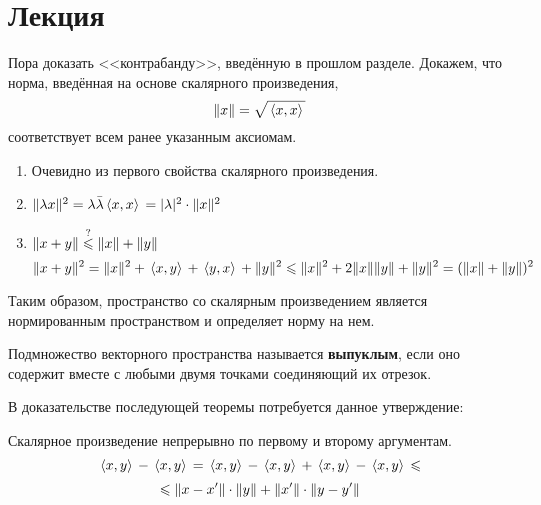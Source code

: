 	\section{Лекция}
	
    Пора доказать <<контрабанду>>, введённую в прошлом разделе. Докажем, что норма, введённая на основе скалярного произведения, 
    $$\| x \| = \sqrt{\, \langle x, x \rangle \,}$$
    соответствует всем ранее указанным аксиомам.

    \begin{enumerate}
    \item Очевидно из первого свойства скалярного произведения.
    \item $\| \lambda x \|^2 = \lambda \bar{\lambda} \, \langle x, x \rangle \, = | \lambda |^2 \cdot \| x \|^2$
    \item $\| x+y \| \overset{?}{\leqslant} \| x \| + \| y \|$
	      $$\| x + y \|^2 = \| x \|^2 + \, \langle x, y \rangle \, + \, \langle y, x \rangle \, + \| y \|^2 \leqslant \| x \|^2 + 2 \| x \| \| y \| + \| y \|^2
			= (\| x \| + \| y \|)^2
	      $$
    \end{enumerate}
	Таким образом, пространство со скалярным произведением является нормированным пространством и определяет норму на нем.
	
	\begin{defi}
		Подмножество векторного пространства называется \textbf{выпуклым}, если оно содержит вместе с любыми двумя 
		точками соединяющий их отрезок.
	\end{defi}

	В доказательстве последующей теоремы потребуется данное утверждение:
	\begin{state}
		Скалярное произведение непрерывно по первому и второму аргументам.
		$$\, \langle x, y \rangle \, - \, \langle x, y \rangle \, = \, \langle x, y \rangle \, - \, \langle x, y \rangle \, + \, \langle x, y \rangle \, - \, \langle x, y \rangle \, \leqslant$$
		$$\leqslant \| x - x' \|\cdot \| y \| + \| x' \| \cdot \| y - y' \|$$
	\end{state}
	
